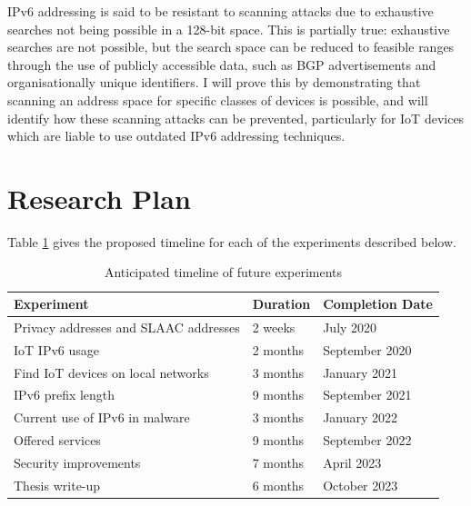 \documentclass[10pt,sigconf]{acmart}
\begin{document}
IPv6 addressing is said to be resistant to scanning attacks due to exhaustive searches not being possible in a 128-bit space.
This is partially true:
exhaustive searches are not possible, but the search space can be reduced to feasible ranges through the use of publicly accessible data, such as BGP advertisements and organisationally unique identifiers.
I will prove this by demonstrating that scanning an address space for specific classes of devices is possible, and will identify how these scanning attacks can be prevented, particularly for IoT devices which are liable to use outdated IPv6 addressing techniques.


\section{Research Plan}

Table \ref{research-timeline} gives the proposed timeline for each of the experiments described below.

\begin{table}[]
\centering
\label{research-timeline}
\begin{center}
	\begin{tabular}{|l|l|l|}
		\hline
		Experiment & Duration & Completion Date   \\ \hline
		Privacy addresses and SLAAC addresses & 2 weeks & July 2020   \\ \hline
		IoT IPv6 usage & 2 months & September 2020     \\ \hline
		Find IoT devices on local networks & 3 months & January 2021  \\ \hline
		IPv6 prefix length & 9 months & September 2021  \\ \hline
		Current use of IPv6 in malware & 3 months & January 2022 \\ \hline
		Offered services  & 9 months & September 2022  \\ \hline
		Security improvements & 7 months & April 2023  \\ \hline
		Thesis write-up & 6 months & October 2023 \\ 
		\hline
	\end{tabular}
	\caption{Anticipated timeline of future experiments}
\end{center}
\end{table}
\end{document}
